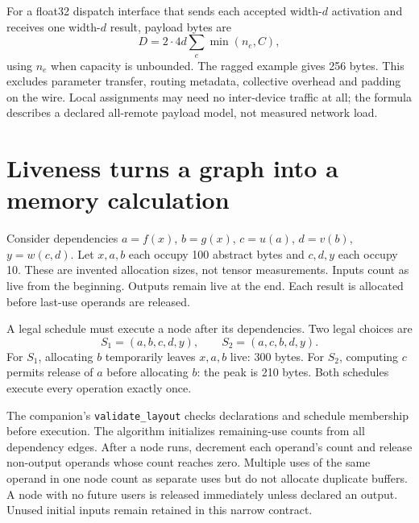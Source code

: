 For a float32 dispatch interface that sends each accepted width-$d$ activation
and receives one width-$d$ result, payload bytes are
\begin{equation}
 D=2\cdot4d\sum_e\min(n_e,C),
 \label{eq:bytes}
\end{equation}
using $n_e$ when capacity is unbounded. The ragged example gives 256 bytes.
This excludes parameter transfer, routing metadata, collective overhead and
padding on the wire. Local assignments may need no inter-device traffic at all;
the formula describes a declared all-remote payload model, not measured network load.

\section{Liveness turns a graph into a memory calculation}
Consider dependencies $a=f(x)$, $b=g(x)$, $c=u(a)$, $d=v(b)$,
$y=w(c,d)$. Let $x,a,b$ each occupy 100 abstract bytes and $c,d,y$ each
occupy 10. These are invented allocation sizes, not tensor measurements.
Inputs count as live from the beginning. Outputs remain live at the end.
Each result is allocated before last-use operands are released.

A legal schedule must execute a node after its dependencies. Two legal choices are
\[
 S_1=(a,b,c,d,y),\qquad S_2=(a,c,b,d,y).
\]
For $S_1$, allocating $b$ temporarily leaves $x,a,b$ live: 300 bytes.
For $S_2$, computing $c$ permits release of $a$ before allocating $b$:
the peak is 210 bytes. Both schedules execute every operation exactly once.



The companion's \texttt{validate\_layout} checks declarations and schedule
membership before execution. The algorithm initializes remaining-use counts
from all dependency edges.
After a node runs, decrement each operand's count and release non-output operands
whose count reaches zero. Multiple uses of the same operand in one node count
as separate uses but do not allocate duplicate buffers.
A node with no future users is released immediately unless declared an output.
Unused initial inputs remain retained in this narrow contract.

